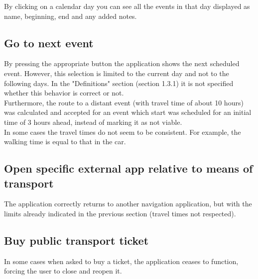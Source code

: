 \documentclass[numbers=noenddot, 12pt, a4paper, oneside]{scrbook}
\begin{document}
By clicking on a calendar day you can see all the events in that day displayed as name, beginning, end and any added notes.

\subsection*{Go to next event}

By pressing the appropriate button the application shows the next scheduled event. However, this selection is limited to the current day and not to the following days. In the "Definitions" section (section 1.3.1) it is not specified whether this behavior is correct or not.\\

Furthermore, the route to a distant event (with travel time of about 10 hours) was calculated and accepted for an event which start was scheduled for an initial time of 3 hours ahead, instead of marking it as not viable.\\

In some cases the travel times do not seem to be consistent. For example, the walking time is equal to that in the car.

\subsection*{Open specific external app relative to means of transport}
The application correctly returns to another navigation application, but with the limits already indicated in the previous section (travel times not respected).

\subsection*{Buy public transport ticket}
In some cases when asked to buy a ticket, the application ceases to function, forcing the user to close and reopen it.
\end{document}
